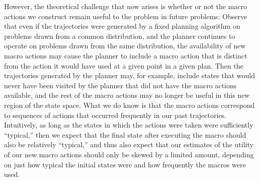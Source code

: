 However, the theoretical challenge that now arises is whether or not the macro actions we construct remain useful to the problem in future problems: Observe that even if the trajectories were generated by a fixed planning algorithm on problems drawn from a common distribution, and the planner continues to operate on problems drawn from the same distribution, the availability of new macro actions may cause the planner to include a macro action that is distinct from the action it would have used at a given point in a given plan. Then the trajectories generated by the planner may, for example, include states that would never have been visited by the planner that did not have the macro actions available, and the rest of the macro actions may no longer be useful in this new region of the state space. What we do know is that the macro actions correspond to sequences of actions that occurred frequently in our past trajectories. Intuitively, as long as the states in which the actions were taken were sufficiently ``typical,'' then we expect that the final state after executing the macro should also be relatively ``typical,'' and thus also expect that our estimates of the utility of our new macro actions should only be skewed by a limited amount, depending on just how typical the initial states were and how frequently the macros were used.






